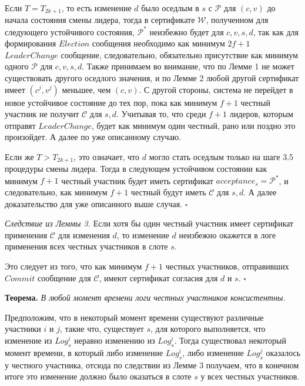 Если $T= T_{2k+1}$, то есть изменение $d$ было оседлым в $s$ с $\mathcal{P}$ для $(c, v)$ до начала состояния смены лидера, тогда в сертификате $\mathcal{W}$, полученном для следующего устойчивого состояния, $\mathcal{P}^{*}$ неизбежно будет для $c, v, s, d$, так как для формирования $Election$ сообщения необходимо как минимум $2f+1$ $LeaderChange$ сообщение, следовательно, обязательно присутствие как минимум одного $\mathcal{P}$ для $c, v, s, d$. Также принимаем во внимание, что по Лемме 1 не может существовать другого оседлого значения, и по Лемме 2 любой другой сертификат имеет $(c^j, v^j)$ меньшее, чем $(c, v)$. С другой стороны, система не перейдет в новое устойчивое состояние до тех пор, пока как минимум $f+1$ честный участник не получит $\mathcal{C}$ для $s, d$. Учитывая то, что среди $f+1$ лидеров, которым отправят $LeaderChange$, будет как минимум один честный, рано или поздно это произойдет. А далее по уже описанному случаю.

Если же  $T > T_{2k+1}$, это означает, что $d$ могло стать оседлым только на шаге 3.5 процедуры смены лидера. Тогда в следующем устойчивом состоянии как минимум $f+1$ честный участник будет иметь сертификат $acceptance_s = \mathcal{P}^{*}$, и следовательно, как минимум $f+1$ честный будут иметь $\mathcal{C}$ для $s, d$. А далее доказательство для уже описанного выше случая.
$\square$
\vspace{10pt}

\textit{Следствие из Леммы 3.} Если хотя бы один честный участник имеет сертификат применения $\mathcal{C}$ для изменения $d$, то  изменение $d$ неизбежно окажется в логе применения всех честных участников в слоте $s$. 

Это следует из того, что как минимум $f+1$ честных участников, отправивших $Commit$ сообщение для $\mathcal{C}$, имеют сертификат согласия для $d$ и $s$. $\square$
\vspace{10pt}

\textbf{Теорема.} \textit{В любой момент времени логи честных участников консистентны.}

Предположим, что в некоторый момент времени существуют различные участники $i$ и $j$, такие что, существует $s$, для которого выполняется, что изменение из $Log^i_s$ неравно изменению из $Log^i_s$. Тогда существовал некоторый момент времени, в который либо изменение $Log^i_s$, либо изменение $Log^j_s$ оказалось у честного участника, отсюда по следствии из Лемме 3 получаем, что в конечном итоге это изменение должно было оказаться в слоте $s$ у всех честных участников.

